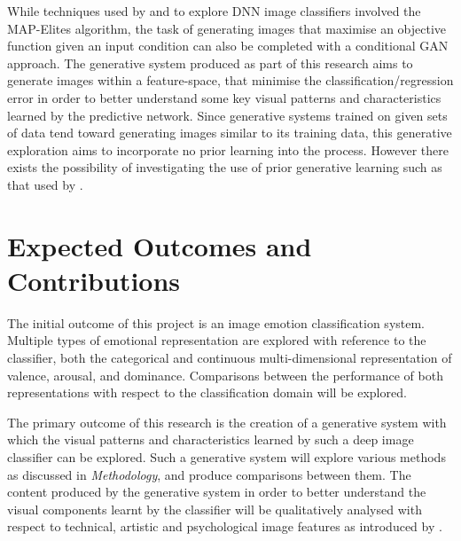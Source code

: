 \documentclass{article}
\begin{document}
While techniques used by \citet{nguyen2015deep} and \citet{nguyen2015innovation} to explore DNN image classifiers involved the MAP-Elites algorithm, the task of generating images that maximise an objective function given an input condition can also be completed with a conditional GAN approach.
The generative system produced as part of this research aims to generate images within a feature-space, that minimise the classification/regression error in order to better understand some key visual patterns and characteristics learned by the predictive network.
Since generative systems trained on given sets of data tend toward generating images similar to its training data, this generative exploration aims to incorporate no prior learning into the process.
However there exists the possibility of investigating the use of prior generative learning such as that used by \citet{nguyen2016synthesizing}.

\section{Expected Outcomes and Contributions}

The initial outcome of this project is an image emotion classification system.
Multiple types of emotional representation are explored with reference to the classifier, both the categorical and continuous multi-dimensional representation of valence, arousal, and dominance.
Comparisons between the performance of both representations with respect to the classification domain will be explored.

The primary outcome of this research is the creation of a generative system with which the visual patterns and characteristics learned by such a deep image classifier can be explored.
Such a generative system will explore various methods as discussed in \textit{Methodology}, and produce comparisons between them.
The content produced by the generative system in order to better understand the visual components learnt by the classifier will be qualitatively analysed with respect to technical, artistic and psychological image features as introduced by \citet{machajdik2010affective}.



\end{document}
